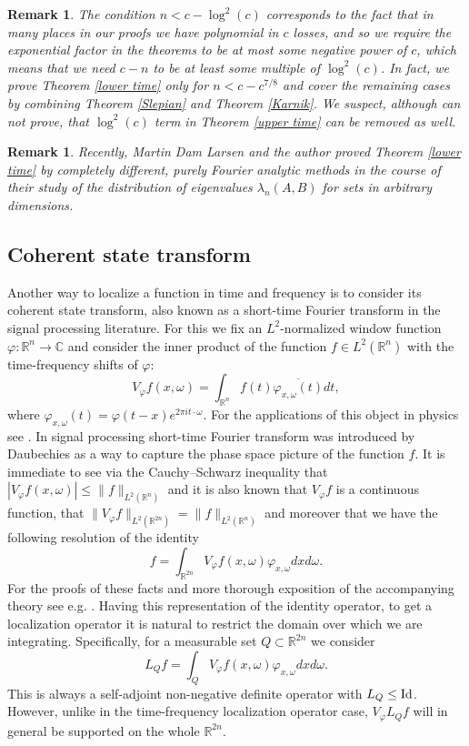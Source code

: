 \documentclass[12pt]{amsart}
\numberwithin{equation}{section}
\newcommand{\R}{\mathbb{R}}
\newcommand{\Cm}{\mathbb{C}}
\renewcommand{\phi}{\varphi}
\newtheorem{remark}[Thm]{Remark}
\begin{document}
\begin{remark}The condition $n < c - \log^2(c)$ corresponds to the fact that in many places in our proofs we have polynomial in $c$ losses, and so we require the exponential factor in the theorems to be at most some negative power of $c$, which means that we need $c - n$ to be at least some multiple of $\log^2(c)$. In fact, we prove Theorem \ref{lower time} only for $n < c - c^{7/8}$ and cover the remaining cases by combining Theorem \ref{Slepian} and Theorem \ref{Karnik}. We suspect, although can not prove, that $\log^2(c)$ term in Theorem \ref{upper time} can be removed as well.
\end{remark}
\begin{remark}
Recently, Martin Dam Larsen and the author \cite{Martin} proved Theorem \ref{lower time} by completely different, purely Fourier analytic methods in the course of their study of the distribution of eigenvalues $\lambda_n(A, B)$ for sets in arbitrary dimensions.
\end{remark}
\subsection{Coherent state transform} Another way to localize a function in time and frequency is to consider its coherent state transform, also known as a short-time Fourier transform in the signal processing literature. For this we fix an $L^2$-normalized window function $\phi:\R^n\to \Cm$ and consider the inner product of the function $f\in L^2(\R^n)$ with the time-frequency shifts of $\phi$:
$$V_\phi f(x, \omega) = \int_{\R^n} f(t)\overline{\phi_{x, \omega}(t)}dt,$$
where $\phi_{x, \omega}(t) = \phi(t-x)e^{2\pi i t \cdot \omega}$. For the applications of this object in physics see \cite{Kla}. In signal processing short-time Fourier transform was introduced by Daubechies \cite{Dau} as a way to capture the phase space picture of the function $f$. It is immediate to see via the Cauchy--Schwarz inequality that $|V_\phi f(x, \omega)|\le \|f\|_{L^2(\R^n)}$ and it is also known that $V_\phi f$ is a continuous function, that $\|V_\phi f\|_{L^2(\R^{2n})} = \|f\|_{L^2(\R^n)}$ and moreover that we have the following resolution of the identity
$$f = \int_{\R^{2n}} V_\phi f(x, \omega) \phi_{x, \omega}dxd\omega.$$
For the proofs of these facts and more thorough exposition of the accompanying theory see e.g. \cite[Chapter 3]{Gro}. Having this representation of the identity operator, to get a localization operator it is natural to restrict the domain over which we are integrating. Specifically, for a measurable set $Q\subset \R^{2n}$ we consider
$$L_{Q}f = \int_{Q} V_\phi f(x, \omega) \phi_{x, \omega}dxd\omega.$$
This is always a self-adjoint non-negative definite operator with $L_Q \le \rm Id$. However, unlike in the time-frequency localization operator case, $V_\phi L_{Q} f$ will in general be supported on the whole $\R^{2n}$.   
\end{document}
